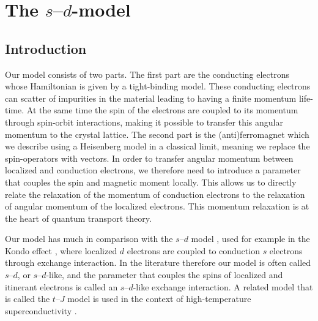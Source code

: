 \chapter{The $s$--$d$-model}\label{ch:sdmodel}
\section{Introduction}
Our model consists of two parts. The first part are the conducting electrons whose Hamiltonian is given by a tight-binding model. These conducting electrons can scatter of impurities in the material leading to having a finite momentum life-time. At the same time the spin of the electrons are coupled to its momentum through spin-orbit interactions, making it possible to transfer this angular momentum to the crystal lattice. The second part is the (anti)ferromagnet which we describe using a Heisenberg model in a classical limit, meaning we replace the spin-operators with vectors. In order to transfer angular momentum between localized and conduction electrons, we therefore need to introduce a parameter that couples the spin and magnetic moment locally. This allows us to directly relate the relaxation of the momentum of conduction electrons to the relaxation of angular momentum of the localized electrons. This momentum relaxation is at the heart of quantum transport theory. 

Our model has much in comparison with the $s$--$d$ model \cite{vonsovsky1946exchange, zener1951interaction,kasuya1956theory,yosida1957magnetic,sdmodel}, used for example in the Kondo effect \cite{10.1143/PTP.32.37}, where localized $d$ electrons are coupled to conduction $s$ electrons through exchange interaction. In the literature therefore our model is often called $s$--$d$, or $s$--$d$-like, and the parameter that couples the spins of localized and itinerant electrons is called an $s$--$d$-like exchange interaction. A related model that is called the $t$--$J$ model is used in the context of high-temperature superconductivity \cite{anderson_resonating_1987, zhang_effective_1988}.

